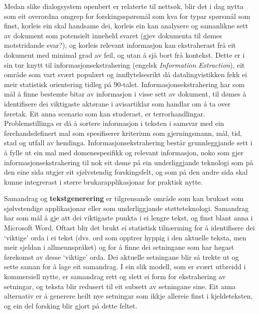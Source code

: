 \begin{multicols}{2}
Medan slike dialogsystem openbert er relaterte til nettsøk, blir det i dag nytta som eit overordna omgrep for forskingsspørsmål som kva for typar spørsmål som finst, korleis ein skal handsame dei, korleis ein kan analysere og samanlikne sett av dokument som potensielt inneheld svaret (gjev dokumenta til dømes motstridande svar?), og korleis relevant informasjon kan ekstraherast frå eit dokument med minimal grad av feil, og utan å sjå bort frå kontekst. Dette er i sin tur knytt til informasjonsekstrahering (engelsk \textit{Information Extraction}), eit område som vart svært populært og innflytelsesrikt då datalingvistikken fekk ei meir statistisk orientering tidleg på 90-talet. Informasjonsekstrahering har som mål å finne bestemte bitar av informasjon i visse sett av dokument, til dømes å identifisere dei viktigaste aktørane i avisartiklar som handlar om å ta over føretak. Eit anna scenario som kan studerast, er terrorhandlingar. Problemstillinga er då å sortere informasjon i teksten i samsvar med ein førehandsdefinert mal som spesifiserer kriterium som gjerningsmann, mål, tid, stad og utfall av hendinga. Informasjonsekstrahering består grunnleggjande sett i å fylle ut ein mal med domenespesifikk og relevant informasjon, noko som gjer informasjonsekstrahering til nok eit døme på ein underliggjande teknologi som på den eine sida utgjer eit sjølvstendig forskingsfelt, og som på den andre sida skal kunne integrerast i større brukarapplikasjonar for praktisk nytte.

Samandrag og \textbf{tekstgenerering} er tilgrensande område som kan brukast som sjølvstendige applikasjonar eller som underliggjande støtteteknologi. Samandrag har som mål å gje att dei viktigaste punkta i ei lengre tekst, og finst blant anna i Microsoft Word. Oftast blir det brukt ei statistisk tilnærming for å identifisere dei `viktige' orda i ei tekst (dvs. ord som opptrer hyppig i den aktuelle teksta, men meir sjeldan i allmennspråket) og for å finne dei setningane som har høgast førekomst av desse `viktige' orda. Dei aktuelle setningane blir så trekte ut og sette saman for å lage eit samandrag. I ein slik modell, som er svært utbreidd i kommersiell nytte, er samandrag rett og slett ei form for ekstrahering av setningar, og teksta blir redusert til eit subsett av setningane sine. Eit anna alternativ er å generere heilt nye setningar som ikkje allereie finst i kjeldeteksten, og ein del forsking blir gjort på dette feltet.



\end{multicols}
